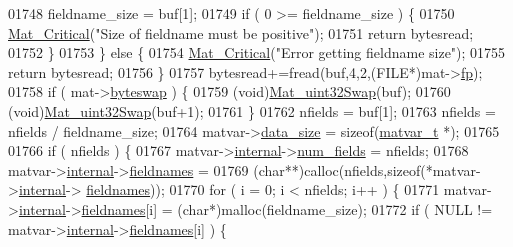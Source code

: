 \begin{DoxyCode}
{{{{{{{{{{{{{{{01748             fieldname\_size = buf[1];
01749             \textcolor{keywordflow}{if} ( 0 >= fieldname\_size ) \{
01750                 \hyperlink{group__mat__util_gaf51f2bfbb5580f575e4dd79757e2b80c}{Mat\_Critical}(\textcolor{stringliteral}{"Size of fieldname must be positive"});
01751                 \textcolor{keywordflow}{return} bytesread;
01752             \}
01753         \} \textcolor{keywordflow}{else} \{
01754             \hyperlink{group__mat__util_gaf51f2bfbb5580f575e4dd79757e2b80c}{Mat\_Critical}(\textcolor{stringliteral}{"Error getting fieldname size"});
01755             \textcolor{keywordflow}{return} bytesread;
01756         \}
01757         bytesread+=fread(buf,4,2,(FILE*)mat->\hyperlink{struct__mat__t_a85f562e407ca9ad4d2a6e14f839432b7}{fp});
01758         \textcolor{keywordflow}{if} ( mat->\hyperlink{struct__mat__t_a99d207977af5e04941ace56d71817a40}{byteswap} ) \{
01759             (void)\hyperlink{endian_8c_a8cb0d0750e2eaf9840d95db531934f4f}{Mat\_uint32Swap}(buf);
01760             (void)\hyperlink{endian_8c_a8cb0d0750e2eaf9840d95db531934f4f}{Mat\_uint32Swap}(buf+1);
01761         \}
01762         nfields = buf[1];
01763         nfields = nfields / fieldname\_size;
01764         matvar->\hyperlink{group___m_a_t_a9ad1c82e2b568da617e12dc73a26e1f9}{data\_size} = \textcolor{keyword}{sizeof}(\hyperlink{group___m_a_t_structmatvar__t}{matvar\_t} *);
01765 
01766         \textcolor{keywordflow}{if} ( nfields ) \{
01767             matvar->\hyperlink{group___m_a_t_a6e97e3ed9f40c49322c18561c2a94e92}{internal}->\hyperlink{structmatvar__internal_a93fc447484f455eddf9334f2e9e411c2}{num\_fields} = nfields;
01768             matvar->\hyperlink{group___m_a_t_a6e97e3ed9f40c49322c18561c2a94e92}{internal}->\hyperlink{structmatvar__internal_a7574d000bfc98ad4860ae6590b8d4985}{fieldnames} =
01769                 (\textcolor{keywordtype}{char}**)calloc(nfields,\textcolor{keyword}{sizeof}(*matvar->\hyperlink{group___m_a_t_a6e97e3ed9f40c49322c18561c2a94e92}{internal}->
      \hyperlink{structmatvar__internal_a7574d000bfc98ad4860ae6590b8d4985}{fieldnames}));
01770             \textcolor{keywordflow}{for} ( i = 0; i < nfields; i++ ) \{
01771                 matvar->\hyperlink{group___m_a_t_a6e97e3ed9f40c49322c18561c2a94e92}{internal}->\hyperlink{structmatvar__internal_a7574d000bfc98ad4860ae6590b8d4985}{fieldnames}[i] = (\textcolor{keywordtype}{char}*)malloc(fieldname\_size);
01772                 \textcolor{keywordflow}{if} ( NULL != matvar->\hyperlink{group___m_a_t_a6e97e3ed9f40c49322c18561c2a94e92}{internal}->\hyperlink{structmatvar__internal_a7574d000bfc98ad4860ae6590b8d4985}{fieldnames}[i] ) \{
}}}}}}}}}}}}}}}
\end{DoxyCode}
